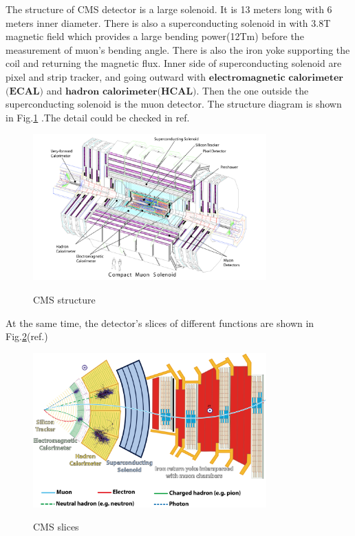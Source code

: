 		The structure of CMS detector is a large solenoid. It is 13 meters long with 6 meters inner diameter. There is also a superconducting solenoid in with 3.8T magnetic field which provides a large bending power(12Tm) before the measurement of muon's bending angle. There is also the iron yoke supporting the coil and returning the magnetic flux. Inner side of superconducting solenoid are pixel and strip tracker, and going outward with $\textbf{electromagnetic}$ $\textbf{calorimeter}$$\textbf{(ECAL)}$ and $\textbf{hadron}$ $\textbf{calorimeter}$$\textbf{(HCAL)}$. Then the one outside the superconducting solenoid is the muon detector. The structure diagram is shown in Fig.\ref{ExpApp:fig:CMS_structure} .The detail could be checked in ref.\cite{Chatrchyan:2008aa}

		\begin{figure}[H]
		\centering{}
	    	\includegraphics[width=0.8\textwidth]{Figures/ExpApparatus/CMS_detector.png}\\
		\caption{CMS structure\cite{Chatrchyan:2008aa}}
		\label{ExpApp:fig:CMS_structure}
		\end{figure}
		\FloatBarrier

		At the same time, the detector's slices of different functions are shown in Fig.\ref{ExpApp:fig:CMS_slices}(ref.\cite{Barney:2120661})

		\begin{figure}[H]
		\centering{}
	    	\includegraphics[width=0.8\textwidth]{Figures/ExpApparatus/CMSslice_whiteBackground.png}\\
		\caption{CMS slices\cite{Barney:2120661}}
		\label{ExpApp:fig:CMS_slices}
		\end{figure}
		\FloatBarrier

